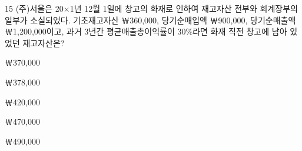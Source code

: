 \begin{question}{15}
(주)서울은 20×1년 12월 1일에 창고의 화재로 인하여 재고자산 전부와 회계장부의 일부가 소실되었다. 기초재고자산 ￦360,000, 당기순매입액 ￦900,000, 당기순매출액 ￦1,200,000이고, 과거 3년간 평균매출총이익률이 30\%라면 화재 직전 창고에 남아 있었던 재고자산은?
\begin{choices}
  \item ￦370,000
  \item ￦378,000
  \item ￦420,000
  \item ￦470,000
  \item ￦490,000
\end{choices}
\end{question}
